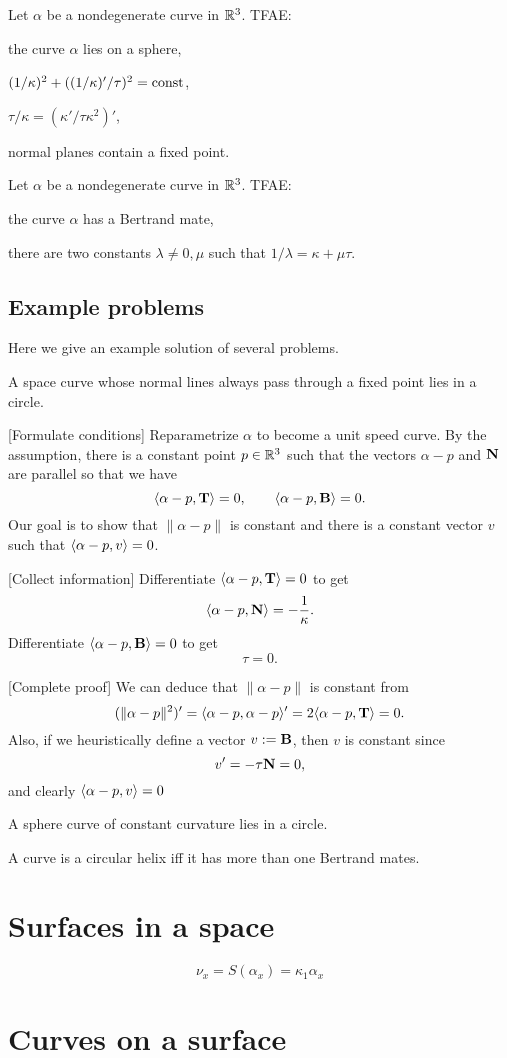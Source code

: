 \documentclass{../exp}
\def\a{\alpha}
\begin{document}
\begin{ex}
Let $\a$ be a nondegenerate curve in $\mathbb{R}^3$.
TFAE:
\begin{cond}
\item the curve $\a$ lies on a sphere,
\item $(1/\kappa)^2+((1/\kappa)'/\tau)^2=\operatorname{const}$,
\item $\tau/\kappa=(\kappa'/\tau\kappa^2)'$,
\item normal planes contain a fixed point.
\end{cond}
\end{ex}

\begin{ex}
Let $\a$ be a nondegenerate curve in $\mathbb{R}^3$.
TFAE:
\begin{cond}
\item the curve $\a$ has a Bertrand mate,
\item there are two constants $\lambda\ne0,\mu$ such that $1/\lambda=\kappa+\mu\tau$.
\end{cond}
\end{ex}


\subsection{Example problems}
Here we give an example solution of several problems.

\begin{ex}
A space curve whose normal lines always pass through a fixed point lies in a circle.
\end{ex}
\begin{pf}
[Formulate conditions]
Reparametrize $\a$ to become a unit speed curve.
By the assumption, there is a constant point $p\in\mathbb{R}^3$ such that the vectors $\a-p$ and $\mathbf{N}$ are parallel so that we have
\[\<\a-p,\bT\>=0,\qquad\<\a-p,\bB\>=0.\]
Our goal is to show that $\|\a-p\|$ is constant and there is a constant vector $v$ such that $\<\a-p,v\>=0$.

[Collect information]
Differentiate $\<\a-p,\bT\>=0$ to get
\[\<\a-p,\bN\>=-\frac1\kappa.\]
Differentiate $\<\a-p,\bB\>=0$ to get
\[\tau=0.\]

[Complete proof]
We can deduce that $\|\a-p\|$ is constant from
\[(\|\a-p\|^2)'=\<\a-p,\a-p\>'=2\<\a-p,\bT\>=0.\]
Also, if we heuristically define a vector $v:=\mathbf{B}$, then $v$ is constant since
\[v'=-\tau\mathbf{N}=0,\]
and clearly $\<\a-p,v\>=0$
\end{pf}


\begin{ex}
A sphere curve of constant curvature lies in a circle.
\end{ex}
\begin{ex}
A curve is a circular helix iff it has more than one Bertrand mates.
\end{ex}










\section{Surfaces in a space}
\[\nu_x=S(\a_x)=\kappa_1\a_x\]


\section{Curves on a surface}
\end{document}
